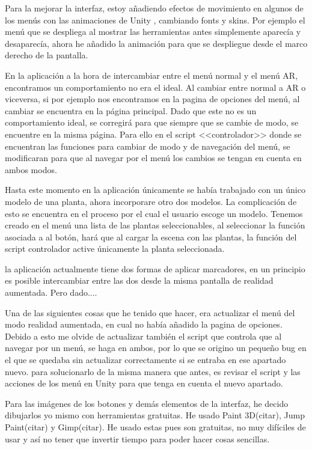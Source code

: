 Para la mejorar la interfaz, estoy añadiendo efectos de movimiento en algunos de los menús con las animaciones de Unity , cambiando fonts y skins. Por ejemplo el menú que se despliega al mostrar las herramientas antes simplemente aparecía y desaparecía, ahora he añadido la animación para que se despliegue desde el marco derecho de la pantalla.

En la aplicación a la hora de intercambiar entre el menú normal y el menú AR, encontramos un comportamiento no era el ideal. Al cambiar entre normal a AR o viceversa, si por ejemplo nos encontramos en la pagina de opciones del menú, al cambiar se encuentra en la página principal. Dado que este no es un comportamiento ideal, se corregirá para que siempre que se cambie de modo, se encuentre en la misma página. Para ello en el script <<controlador>> donde se encuentran las funciones para cambiar de modo y de navegación del menú, se modificaran para que al navegar por el menú los cambios se tengan en cuenta en ambos modos.

Hasta este momento en la aplicación únicamente se había trabajado con un único modelo de una planta, ahora incorporare otro dos modelos.  La complicación de esto se encuentra en el proceso por el cual el usuario escoge un modelo. Tenemos creado en el menú una lista de las plantas seleccionables, al seleccionar la función asociada a al botón, hará que al cargar la escena con las plantas, la función del script controlador active únicamente la planta seleccionada.

la aplicación actualmente tiene dos formas de aplicar marcadores, en un principio es posible intercambiar entre las dos desde la misma pantalla de realidad aumentada. Pero dado.... 

Una de las siguientes cosas que he tenido que hacer, era actualizar el menú del modo realidad aumentada, en cual no había añadido la pagina de opciones. Debido a esto me olvide de actualizar también el script que controla que al navegar por un menú, se haga en ambos, por lo que se origino un pequeño bug en el que se quedaba sin actualizar correctamente si se entraba en ese apartado nuevo. para solucionarlo de la misma manera que antes, es revisar el script y las acciones de los menú en Unity para que tenga en cuenta el nuevo apartado.


Para las imágenes de los botones y demás elementos de la interfaz, he decido dibujarlos yo mismo con herramientas gratuitas. He usado Paint 3D(citar), Jump Paint(citar) y Gimp(citar). He usado estas pues son gratuitas, no muy difíciles de usar y así no tener que invertir tiempo para poder hacer cosas sencillas.



